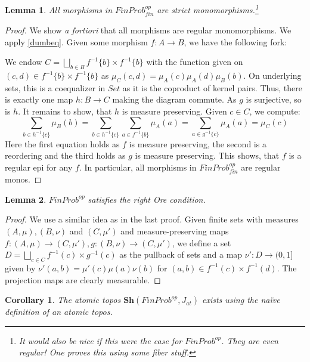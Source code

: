 \documentclass[a4paper,draft]{amsproc}
\theoremstyle{plain}
\newtheorem{lemma}{Lemma}[section]
\newtheorem{corollary}{Corollary}[section]
\theoremstyle{definition}
\theoremstyle{remark}
\numberwithin{equation}{section}
\begin{document}
\begin{lemma}\label{subcanonical} All morphisms in $FinProb^{op}_{fin}$ are strict monomorphisms.\footnote{It would also be nice if this were the case for $FinProb^{op}$. They are even regular! One proves this using some fiber stuff.}
\end{lemma}
\begin{proof} We show \emph{a fortiori} that all morphisms are regular monomorphisms. We apply \ref{dumbeq}.
Given some morphism $f:A\rightarrow B$, we have the following fork:
\begin{center} \end{center}
We endow $C=\bigsqcup_{b\in B}f^{-1}\{b\}\times f^{-1}\{b \}$ with the function given on $(c,d)\in f^{-1}\{b\}\times f^{-1}\{b \}$ as $\mu_C(c,d)=\mu_A(c)\mu_A(d)\mu_B(b)$.
On underlying sets, this is a coequalizer in $Set$ as it is the coproduct of kernel pairs. Thus, there is exactly one map $h:B\rightarrow C$ making the diagram commute. As $g$ is surjective, so is $h$. It remains to show, that $h$ is measure preserving. Given $c\in C$, we compute:
\[\sum_{b\in h^{-1}\{c \}} \mu_B(b)=\sum_{b\in h^{-1}\{c \}} \sum_{a \in f^{-1}\{ b\} } \mu_A(a)=\sum_{a\in g^{-1}\{c\}} \mu_A(a)=\mu_C(c) \] 
Here the first equation holds as $f$ is measure preserving, the second is a reordering and the third holds as $g$ is measure preserving. This shows, that $f$ is a regular epi for any $f$. In particular, all morphisms in $FinProb^{op}_{fin}$ are regular monos.
\end{proof}
\begin{lemma}\label{rightore}
$FinProb^{op}$ satisfies the right Ore condition. 
\end{lemma}%
\begin{proof}
We use a similar idea as in the last proof. Given finite sets with measures $(A,\mu),(B,\nu)$ and $(C,\mu')$ and measure-preserving maps $f:(A,\mu)\rightarrow (C,\mu') ,g: (B,\nu)\rightarrow (C,\mu')$, we define a set $D=\bigsqcup_{c\in C} f^{-1}(c)\times g^{-1}(c)$ as the pullback of sets and a map $\nu':D\rightarrow (0,1]$ given by $\nu'(a,b)=\mu'(c)\mu(a)\nu(b)$ for $(a,b)\in f^{-1}(c)\times f^{-1}(d)$. The projection maps are clearly measurable.
\end{proof}%
\begin{corollary}
The atomic topos $\textbf{Sh}(FinProb^{op},J_{at})$ exists using the na\"ive definition of an atomic topos.
\end{corollary}
\end{document}
